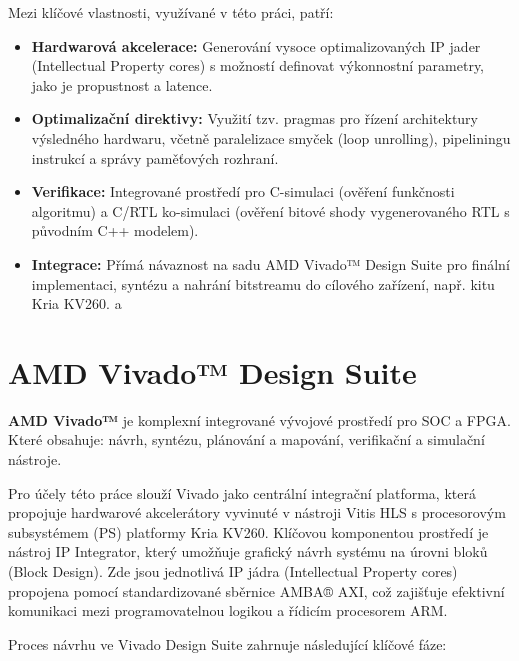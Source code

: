 Mezi klíčové vlastnosti, využívané v této práci, patří:

\begin{itemize}
    \item \textbf{Hardwarová akcelerace:} Generování vysoce optimalizovaných IP jader (Intellectual Property cores) s možností definovat výkonnostní parametry, jako je propustnost a latence.
    
    \item \textbf{Optimalizační direktivy:} Využití tzv. pragmas pro řízení architektury výsledného hardwaru, včetně paralelizace smyček (loop unrolling), pipeliningu instrukcí a správy paměťových rozhraní.
    
    \item \textbf{Verifikace:} Integrované prostředí pro C-simulaci (ověření funkčnosti algoritmu) a C/RTL ko-simulaci (ověření bitové shody vygenerovaného RTL s původním C++ modelem).

    \item \textbf{Integrace:} Přímá návaznost na sadu AMD Vivado™ Design Suite pro finální implementaci, syntézu a nahrání bitstreamu do cílového zařízení, např. kitu Kria KV260. a  \cite{amd_vitis}
\end{itemize}

\newpage

\section{AMD Vivado™ Design Suite}
\textbf{AMD Vivado™} je komplexní integrované vývojové prostředí pro SOC a FPGA. Které obsahuje: návrh, syntézu, plánování a mapování, verifikační a simulační nástroje. 

Pro účely této práce slouží Vivado jako centrální integrační platforma, která propojuje hardwarové akcelerátory vyvinuté v nástroji Vitis HLS s procesorovým subsystémem (PS) platformy Kria KV260. Klíčovou komponentou prostředí je nástroj IP Integrator, který umožňuje grafický návrh systému na úrovni bloků (Block Design). Zde jsou jednotlivá IP jádra (Intellectual Property cores) propojena pomocí standardizované sběrnice AMBA® AXI, což zajišťuje efektivní komunikaci mezi programovatelnou logikou a řídicím procesorem ARM.

Proces návrhu ve Vivado Design Suite zahrnuje následující klíčové fáze:


